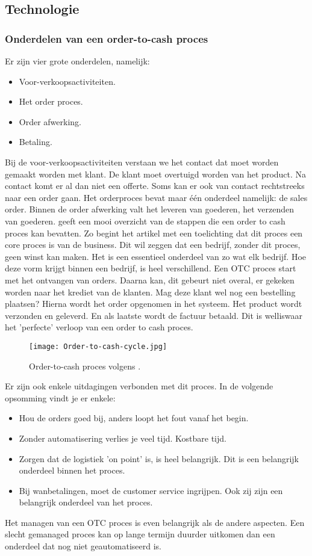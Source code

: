 \subsection{Technologie}
\subsubsection{Onderdelen van een order-to-cash proces}
Er zijn vier grote onderdelen, namelijk:
\begin{itemize}
	\item Voor-verkoopsactiviteiten.
	\item Het order proces.
	\item Order afwerking.
	\item Betaling.
\end{itemize}
Bij de voor-verkoopsactiviteiten verstaan we het contact dat moet worden gemaakt worden met klant. De klant moet overtuigd worden van het product. Na contact komt er al dan niet een offerte. Soms kan er ook van contact rechtstreeks naar een order gaan. 
Het orderproces bevat maar één onderdeel namelijk: de sales order. 
Binnen de order afwerking valt het leveren van goederen, het verzenden van goederen.
\textcite{Kumaran2015} geeft een mooi overzicht van de stappen die een order to cash proces kan bevatten. Zo begint het artikel met een toelichting dat dit proces een core proces is van de business. Dit wil zeggen dat een bedrijf, zonder dit proces, geen winst kan maken. Het is een essentieel onderdeel van zo wat elk bedrijf. Hoe deze vorm krijgt binnen een bedrijf, is heel verschillend. Een OTC proces start met het ontvangen van orders. Daarna kan, dit gebeurt niet overal, er gekeken worden naar het krediet van de klanten. Mag deze klant wel nog een bestelling plaatsen? Hierna wordt het order opgenomen in het systeem. Het product wordt verzonden en geleverd. En als laatste wordt de factuur betaald. Dit is welliswaar het 'perfecte' verloop van een order to cash proces. 
\begin{figure}[h]
	\texttt{[image: Order-to-cash-cycle.jpg]}
	\caption{Order-to-cash proces volgens \textcite{Kumaran2015}.}
	\centering
\end{figure}
Er zijn ook enkele uitdagingen verbonden met dit proces. In de volgende opsomming vindt je er enkele:
\begin{itemize}
	\item Hou de orders goed bij, anders loopt het fout vanaf het begin. 
	\item Zonder automatisering verlies je veel tijd. Kostbare tijd.
	\item Zorgen dat de logistiek 'on point' is, is heel belangrijk. Dit is een belangrijk onderdeel binnen het proces.
	\item Bij wanbetalingen, moet de customer service ingrijpen. Ook zij zijn een belangrijk onderdeel van het proces.
\end{itemize}
Het managen van een OTC proces is even belangrijk als de andere aspecten. Een slecht gemanaged proces kan op lange termijn duurder uitkomen dan een onderdeel dat nog niet geautomatiseerd is. 
